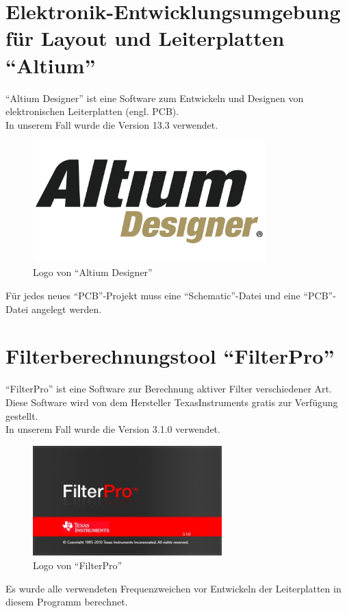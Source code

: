 \newpage
\section{Elektronik-Entwicklungsumgebung für Layout und Leiterplatten \enquote{Altium}} \label{sec:6.1}
\enquote{Altium Designer} ist eine Software zum Entwickeln und Designen von elektronischen Leiterplatten (engl. PCB).\\
In unserem Fall wurde die Version 13.3 verwendet. 
\begin{figure} [H]
	\centering
	\includegraphics[width=0.8\textwidth]{img/Grundlagen/Altium/ad_logo.png}
	\caption[Logo von \enquote{Altium Designer}]{Logo von \enquote{Altium Designer}\footnotemark}
	\label{fig:6.1.1}
\end{figure}
Für jedes neues \enquote{PCB}-Projekt muss eine \enquote{Schematic}-Datei und eine \enquote{PCB}-Datei angelegt werden.

\newpage
\section{Filterberechnungstool \enquote{FilterPro}}\label{sec:6.2}
\enquote{FilterPro} ist eine Software zur Berechnung aktiver Filter verschiedener Art.
Diese Software wird von dem Hersteller TexasInstruments gratis zur Verfügung gestellt.\\
In unserem Fall wurde die Version 3.1.0 verwendet. 
\begin{figure} [H]
	\centering
	\includegraphics[width=0.65\textwidth]{img/VerwendeteTools/FilterPro.jpg}
	\caption[Logo von \enquote{FilterPro}]{Logo von \enquote{FilterPro}}
	\label{fig:6.2.1}
\end{figure}
Es wurde alle verwendeten Frequenzweichen vor Entwickeln der Leiterplatten in diesem Programm berechnet.
